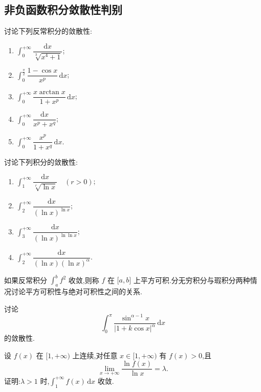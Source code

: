 \documentclass[../数学分析培优讲义.tex]{subfiles}
\begin{document}
\newpage

\subsection{非负函数积分敛散性判别}

\begin{example}
讨论下列反常积分的敛散性:
\begin{enumerate}[label=(\arabic*)]
    \item $\displaystyle\int_0^{+\infty}\dfrac{\mathrm{d}x}{\sqrt[3]{x^4+1}}$;
    \item $\displaystyle\int_0^{\frac{\pi}{2}}\dfrac{1-\cos x}{x^p}\,\mathrm{d}x$;
    \item $\displaystyle\int_0^{+\infty}\dfrac{x\arctan x}{1+x^p}\,\mathrm{d}x$;
    \item $\displaystyle\int_0^{+\infty}\dfrac{\mathrm{d}x}{x^p+x^q}$;
    \item $\displaystyle\int_0^{+\infty}\dfrac{x^p}{1+x^q}\,\mathrm{d}x$.
\end{enumerate}
\end{example}
\exampleblank

\begin{example}
讨论下列积分的敛散性:
\begin{enumerate}[label=(\arabic*)]
    \item $\displaystyle\int_1^{+\infty}\dfrac{\mathrm{d}x}{\sqrt[r]{\ln x}}\quad(r>0)$;
    \item $\displaystyle\int_2^{+\infty}\dfrac{\mathrm{d}x}{(\ln x)^{\ln x}}$;
    \item $\displaystyle\int_3^{+\infty}\dfrac{\mathrm{d}x}{(\ln x)^{\ln\ln x}}$;
    \item $\displaystyle\int_2^{+\infty}\dfrac{\mathrm{d}x}{(\ln x)(\ln x)^\alpha}$.
\end{enumerate}
\end{example}
\exampleblank

\begin{example}
如果反常积分 $\displaystyle\int_a^bf^2$ 收敛,则称 $f$ 在 $\lbrack a,b\rbrack$ 上平方可积.分无穷积分与瑕积分两种情况讨论平方可积性与绝对可积性之间的关系.
\end{example}
\exampleblank

\begin{example}
讨论
\[
    \int_0^\pi\dfrac{\sin^{\alpha-1}x}{|1+k\cos x|^\alpha}\,\mathrm{d}x
\]
的敛散性.
\end{example}
\exampleblank

\begin{example}
设 $f(x)$ 在 $\lbrack 1,+\infty)$ 上连续,对任意 $x\in\lbrack 1,+\infty)$ 有 $f(x)>0$,且
\[
    \lim\limits_{x\to+\infty}\dfrac{\ln f(x)}{\ln x}=\lambda.
\]
证明:$\lambda>1$ 时,$\displaystyle\int_1^{+\infty}f(x)\,\mathrm{d}x$ 收敛.
\end{example}
\exampleblank
\end{document}
